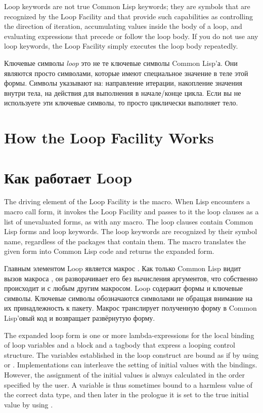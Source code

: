 Loop keywords are not true Common Lisp keywords; they are symbols that
are recognized by the Loop Facility and that provide such capabilities
as controlling the direction of iteration, accumulating values inside
the body of a loop, and evaluating expressions that precede or follow
the loop body.  If you do not use any loop keywords, the Loop Facility
simply executes the loop body repeatedly.

Ключевые символы \emph{loop} это не те ключевые символы Common
Lisp'а. Они являются просто символами, которые имеют специальное
значение в теле этой формы. Символы указывают на: направление
итерации, накопление значения внутри тела, на действия для выполнения
в начале/конце цикла.  Если вы не используете эти ключевые символы, то
 просто циклически выполняет тело.

\section{How the Loop Facility Works}

\section{Как работает Loop}

The driving element of the Loop Facility is the  macro.
When Lisp encounters a  macro call
form, it invokes the Loop Facility and passes to it the loop clauses
as a list of unevaluated forms, as with any macro.
The loop clauses contain Common Lisp forms and loop keywords.  The
loop keywords are recognized by their symbol name, regardless of the
packages that contain them.  The  macro translates the
given form into Common Lisp code and returns the expanded form.

Главным элементом Loop является макрос .  Как только Common
Lisp видит вызов макроса , он разворачивает его без
вычисления аргументов, что собственно происходит и с любым другим
макросом. Loop содержит формы и ключевые символы. Ключевые символы
обозначаются символами не обращая внимание на их принадлежность к
пакету. Макрос  транслирует полученную форму в Common
Lisp'овый код и возвращает развёрнутую форму.

The expanded loop form is one or more lambda-expressions for the local
binding of loop variables and a block and a tagbody that express a
looping control structure.  The variables established in the loop
construct are bound as if by using  or .
Implementations can interleave the setting of initial values with the
bindings.  However, the assignment of the initial values is always
calculated in the order specified by the user.  A variable is thus
sometimes bound to a harmless value of the correct data type, and then
later in the prologue it is set to the true initial value by using
.

